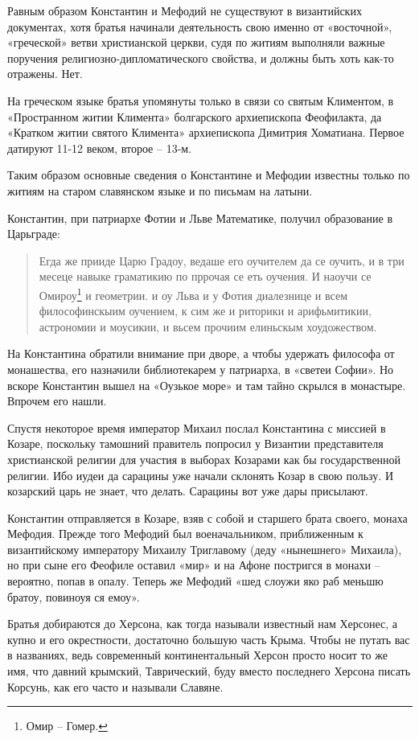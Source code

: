 \documentclass[a5paper,11pt,openany]{article}
\begin{document}
Равным образом Константин и Мефодий не существуют в византийских документах, хотя братья начинали деятельность свою именно от «восточной», «греческой» ветви христианской церкви, судя по житиям выполняли важные поручения религиозно-дипломатического свойства, и должны быть хоть как-то отражены. Нет.

На греческом языке братья упомянуты только в связи со святым Климентом, в «Пространном житии Климента» болгарского архиепископа Феофилакта, да «Кратком житии святого Климента» архиепископа Димитрия Хоматиана. Первое датируют 11-12 веком, второе – 13-м.

Таким образом основные сведения о Константине и Мефодии известны только по житиям на старом славянском языке и по письмам на латыни.

Константин, при патриархе Фотии и Льве Математике, получил образование в Царьграде:

\begin{quotation} 
Егда же прииде Царю Градоу, ведаше его оучителем да се оучить, и в три месеце навыке граматикию по пррочая се еть оучения. И наоучи се Омироу\footnote{Омир – Гомер.} и геометрии. и оу Льва и у Фотия диалезнице и всем философинскыим оучением, к сим же и риторики и арифьмитикии, астрономии и моусикии, и вьсем прочиим елиньскым хоудожеством.
\end{quotation} 

На Константина обратили внимание при дворе, а чтобы удержать философа от монашества, его назначили библиотекарем у патриарха, в «светеи Софии». Но вскоре Константин вышел на «Оузькое море» и там тайно скрылся в монастыре. Впрочем его нашли.
 
Спустя некоторое время император Михаил послал Константина с миссией в Козаре, поскольку тамошний правитель попросил у Византии представителя христианской религии для участия в выборах Козарами как бы государственной религии. Ибо иудеи да сарацины уже начали склонять Козар в свою пользу. И козарский царь не знает, что делать. Сарацины вот уже дары присылают.

Константин отправляется в Козаре, взяв с собой и старшего брата своего, монаха Мефодия. Прежде того Мефодий был военачальником, приближенным к византийскому императору Михаилу Триглавому (деду «нынешнего» Михаила), но при сыне его Феофиле оставил «мир» и на Афоне постригся в монахи – вероятно, попав в опалу. Теперь же Мефодий «шед слоужи яко раб меньшю братоу, повиноуя ся емоу».

Братья добираются до Херсона, как тогда называли известный нам Херсонес, а купно и его окрестности, достаточно большую часть Крыма. Чтобы не путать вас в названиях, ведь современный континентальный Херсон просто носит то же имя, что давний крымский, Таврический, буду вместо последнего Херсона писать Корсунь, как его часто и называли Славяне.
\end{document}
